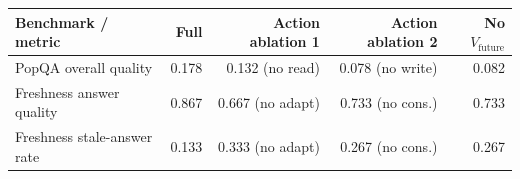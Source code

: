 \begin{tabular}{lrrrr}
\toprule
Benchmark / metric & Full & Action ablation 1 & Action ablation 2 & No $V_{\text{future}}$ \\
\midrule
PopQA overall quality & 0.178 & 0.132 (no read) & 0.078 (no write) & 0.082 \\
Freshness answer quality & 0.867 & 0.667 (no adapt) & 0.733 (no cons.) & 0.733 \\
Freshness stale-answer rate & 0.133 & 0.333 (no adapt) & 0.267 (no cons.) & 0.267 \\
\bottomrule
\end{tabular}

